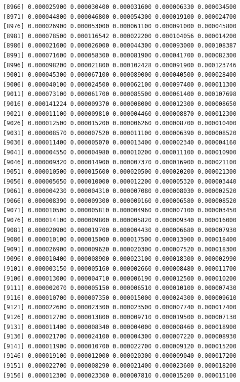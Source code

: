 \documentclass[]{article}
\begin{document}
\begin{verbatim}
 [8966] 0.000025900 0.000030400 0.000031600 0.000006330 0.000034500
 [8971] 0.000044800 0.000046800 0.000054300 0.000019100 0.000024700
 [8976] 0.000026900 0.000053000 0.000061100 0.000091000 0.000045800
 [8981] 0.000078500 0.000116542 0.000022200 0.000104056 0.000014200
 [8986] 0.000021600 0.000026000 0.000044300 0.000093000 0.000108387
 [8991] 0.000071600 0.000058300 0.000081900 0.000041700 0.000082300
 [8996] 0.000098200 0.000021800 0.000102428 0.000091900 0.000123746
 [9001] 0.000045300 0.000067100 0.000089000 0.000040500 0.000028400
 [9006] 0.000040100 0.000024500 0.000062100 0.000097400 0.000011300
 [9011] 0.000073100 0.000061700 0.000085500 0.000061400 0.000107698
 [9016] 0.000141224 0.000009370 0.000008000 0.000012300 0.000008650
 [9021] 0.000011100 0.000009810 0.000004460 0.000008870 0.000012300
 [9026] 0.000012500 0.000015200 0.000006260 0.000008700 0.000010400
 [9031] 0.000008570 0.000007520 0.000011100 0.000006390 0.000008520
 [9036] 0.000011400 0.000005070 0.000013400 0.000002340 0.000004160
 [9041] 0.000004550 0.000004980 0.000010200 0.000011100 0.000010900
 [9046] 0.000009320 0.000014900 0.000007370 0.000016900 0.000021100
 [9051] 0.000010500 0.000015600 0.000020500 0.000020200 0.000021300
 [9056] 0.000005650 0.000010000 0.000012200 0.000005320 0.000003440
 [9061] 0.000004230 0.000004310 0.000007080 0.000008030 0.000002520
 [9066] 0.000008390 0.000009300 0.000009160 0.000006580 0.000008520
 [9071] 0.000010500 0.000005810 0.000004960 0.000007100 0.000003450
 [9076] 0.000014100 0.000009800 0.000005820 0.000009340 0.000016000
 [9081] 0.000020900 0.000019700 0.000004430 0.000006680 0.000007930
 [9086] 0.000010100 0.000015000 0.000017500 0.000013900 0.000018400
 [9091] 0.000026900 0.000009620 0.000020300 0.000007520 0.000018300
 [9096] 0.000010400 0.000008900 0.000023100 0.000018300 0.000002990
 [9101] 0.000003150 0.000005160 0.000002660 0.000008480 0.000011700
 [9106] 0.000013000 0.000004710 0.000006190 0.000012500 0.000010200
 [9111] 0.000002070 0.000005150 0.000006510 0.000010100 0.000007430
 [9116] 0.000010700 0.000007350 0.000015000 0.000024300 0.000009610
 [9121] 0.000022600 0.000023300 0.000023500 0.000007740 0.000017400
 [9126] 0.000012700 0.000013800 0.000009710 0.000019500 0.000007130
 [9131] 0.000011400 0.000008340 0.000004000 0.000008460 0.000018900
 [9136] 0.000021700 0.000024100 0.000004300 0.000007220 0.000008930
 [9141] 0.000011900 0.000010700 0.000022700 0.000009120 0.000015200
 [9146] 0.000019100 0.000012000 0.000020300 0.000009040 0.000017200
 [9151] 0.000022700 0.000008290 0.000021400 0.000023600 0.000018200
 [9156] 0.000012300 0.000023300 0.000007810 0.000015200 0.000015100

\end{verbatim}
\end{document}

